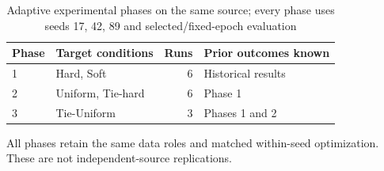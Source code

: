 \begin{table}[t]
\caption{Adaptive experimental phases on the same source; every phase uses seeds 17, 42, 89 and selected/fixed-epoch evaluation}\label{tab:phases}
\centering\begin{tabular}{llrl}\toprule
Phase & Target conditions & Runs & Prior outcomes known\\\midrule
1 & Hard, Soft & 6 & Historical results\\
2 & Uniform, Tie-hard & 6 & Phase 1\\
3 & Tie-Uniform & 3 & Phases 1 and 2\\
\bottomrule\end{tabular}
All phases retain the same data roles and matched within-seed optimization. These are not independent-source replications.
\end{table}
